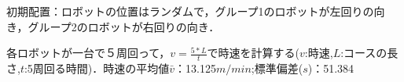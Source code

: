 初期配置：ロボットの位置はランダムで，グループ1のロボットが左回りの向き，グループ2のロボットが右回りの向き．



各ロボットが一台で５周回って，$v=\frac{5*L}{t}$で時速を計算する($v$:時速,$L$:コースの長さ,$t$:5周回る時間)．時速の平均値$\bar v$：13.125$m/min$;標準偏差($s$)：51.384

